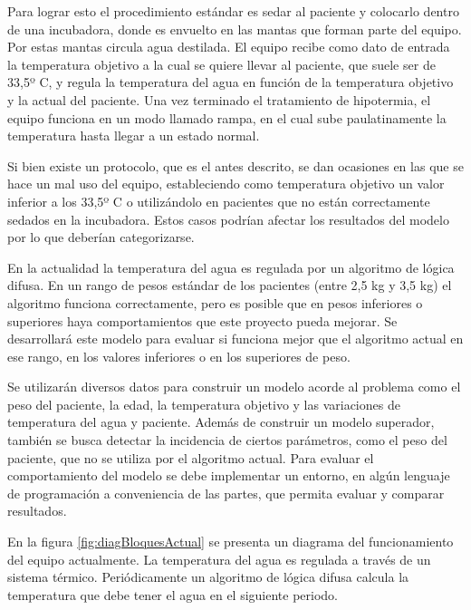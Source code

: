 \documentclass[
11pt, %
]{charter}
\begin{document}
Para lograr esto el procedimiento estándar es sedar al paciente y colocarlo dentro de una incubadora, donde es envuelto en las mantas que forman parte del equipo. Por estas mantas circula agua destilada. El equipo recibe como dato de entrada la temperatura objetivo a la cual se quiere llevar al paciente, que suele ser de 33,5º C, y regula la temperatura del agua en función de la temperatura objetivo y la actual del paciente. Una vez terminado el tratamiento de hipotermia, el equipo funciona en un modo llamado rampa, en el cual sube paulatinamente la temperatura hasta llegar a un estado normal.

Si bien existe un protocolo, que es el antes descrito, se dan ocasiones en las que se hace un mal uso del equipo, estableciendo como temperatura objetivo un valor inferior a los 33,5º C o utilizándolo en pacientes que no están correctamente sedados en la incubadora. Estos casos podrían afectar los resultados del modelo por lo que deberían categorizarse.

En la actualidad la temperatura del agua es regulada por un algoritmo de lógica difusa. En un rango de pesos estándar de los pacientes (entre 2,5 kg y 3,5 kg) el algoritmo funciona correctamente, pero es posible que en pesos inferiores o superiores haya comportamientos que este proyecto pueda mejorar. Se desarrollará este modelo para evaluar si funciona mejor que el algoritmo actual en ese rango, en los valores inferiores o en los superiores de peso. 

Se utilizarán diversos datos para construir un modelo acorde al problema como el peso del paciente, la edad, la temperatura objetivo y las variaciones de temperatura del agua y paciente. Además de construir un modelo superador, también se busca detectar la incidencia de ciertos parámetros, como el peso del paciente, que no se utiliza por el algoritmo actual. Para evaluar el comportamiento del modelo se debe implementar un entorno, en algún lenguaje de programación a conveniencia de las partes, que permita evaluar y comparar resultados. 

En la figura \ref{fig:diagBloquesActual} se presenta un diagrama del funcionamiento del equipo actualmente. La temperatura del agua es regulada a través de un sistema térmico. Periódicamente un algoritmo de lógica difusa calcula la temperatura que debe tener el agua en el siguiente periodo.
\end{document}
